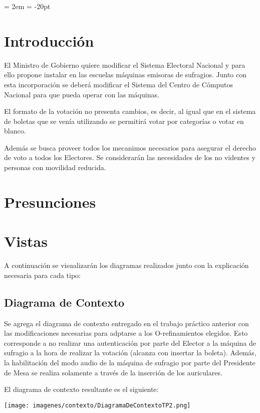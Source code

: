 \documentclass[spanish, 10pt,a4paper]{article}
\numberwithin{equation}{section} %
\begin{document}
{ \oddsidemargin = 2em
	\headheight = -20pt
	\maketitle
}
	\tableofcontents
	\newpage
\section{Introducción}
	El Ministro de Gobierno quiere modificar el Sistema Electoral Nacional y para ello propone instalar en las escuelas máquinas emisoras de sufragios. Junto con esta incorporación se deberá modificar el Sistema del Centro de Cómputos Nacional para que pueda operar con las máquinas.

	El formato de la votación no presenta cambios, es decir, al igual que en el sistema de boletas que se venía utilizando se permitirá votar por categorías o votar en blanco. 
	
	Además se busca proveer todos los mecanimos necesarios para asegurar el derecho de voto a todos los Electores. Se considerarán las necesidades de los no videntes y personas con movilidad reducida. 
	
\section{Presunciones}

\section{Vistas}
	A continuación se visualizarán los diagramas realizados junto con la explicación necesaria para cada tipo:
\subsection{Diagrama de Contexto}
	Se agrega el diagrama de contexto entregado en el trabajo práctico anterior con las modificaciones necesarias para adptarse a los O-refinamientos elegidos. Esto corresponde a no realizar una autenticación por parte del Elector a la máquina de sufragio a la hora de realizar la votación (alcanza con insertar la boleta). Además, la habilitación del modo audio de la máquina de sufragio por parte del Presidente de Mesa se realiza solamente a través de la inserción de los auriculares. 
\par El diagrama de contexto resultante es el siguiente:

\vspace{\baselineskip}
    \begin{center}
                \texttt{[image: imagenes/contexto/DiagramaDeContextoTP2.png]}
                \\
                \vspace{1pt}
                \footnotesize\textit{}
        \end{center}
\vspace{\baselineskip}
\end{document}
